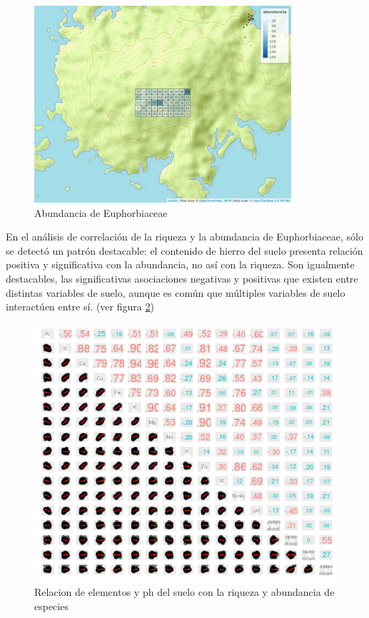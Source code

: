\documentclass[11pt,]{article}
\begin{document}
\begin{figure}
\centering
\includegraphics[width=0.85000\textwidth]{mapa_cuadros_abun_mi_familia.png}
\caption{\label{fig:cuadro_abundancia_de_mi_familia}Abundancia de
Euphorbiaceae}
\end{figure}

En el análisis de correlación de la riqueza y la abundancia de
Euphorbiaceae, sólo se detectó un patrón destacable: el contenido de
hierro del suelo presenta relación positiva y significativa con la
abundancia, no así con la riqueza. Son igualmente destacables, las
significativas asociaciones negativas y positivas que existen entre
distintas variables de suelo, aunque es común que múltiples variables de
suelo interactúen entre sí. (ver figura \ref{fig:suelo_ph_abun_riqu})

\begin{figure}
\centering
\includegraphics{suelo_ph_abun_riqu.png}
\caption{\label{fig:suelo_ph_abun_riqu}Relacion de elementos y ph del
suelo con la riqueza y abundancia de especies}
\end{figure}
\end{document}
